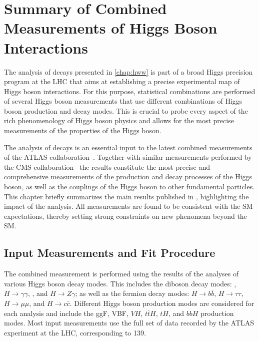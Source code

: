 \chapter{Summary of Combined Measurements of Higgs Boson Interactions}
\label{chap:comb}
The analysis of \HWW decays presented in \cref{chap:hww} is part of a broad Higgs precision program at the LHC that aims at establishing a precise experimental map of Higgs boson interactions.
For this purpose, statistical combinations are performed of several Higgs boson measurements that use different combinations of Higgs boson production and decay modes.
This is crucial to probe every aspect of the rich phenomenology of Higgs boson physics and allows for the most precise measurements of the properties of the Higgs boson. 

The analysis of \HWW decays is an essential input to the latest combined measurements of the ATLAS collaboration~\cite{NaturePaper}.
Together with similar measurements performed by the CMS collaboration~\cite{CMSNaturePaper} the results constitute the most precise and comprehensive measurements of the production and decay processes of the Higgs boson, as well as the couplings of the Higgs boson to other fundamental particles.
This chapter briefly summarizes the main results published in , highlighting the impact of the \HWW analysis.
All measurements are found to be consistent with the SM expectations, thereby setting strong constraints on new phenomena beyond the SM.  

\section{Input Measurements and Fit Procedure}
The combined measurement is performed using the results of the analyses of various Higgs boson decay modes.
This includes the diboson decay modes: \HZZ, $H \to \gamma\gamma$, \HWW, and $H \to Z\gamma$; as well as the fermion decay modes: $H \to b\bar{b}$, $H \to \tau\tau$, $H \to \mu\mu$, and $H \to c\bar{c}$. 
Different Higgs boson production modes are considered for each analysis and include the ggF, VBF, $VH$, $t\bar{t}H$, $tH$, and $bbH$ production modes. 
Most input measurements use the full set of \RunTwo data recorded by the ATLAS experiment at the LHC, corresponding to 139\ifb.

